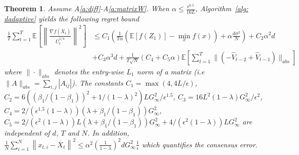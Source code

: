 \documentclass[11pt]{article}
\newtheorem{theorem}{Theorem}
\begin{document}
\begin{theorem}\label{thm: dagm_converge}
Assume A\ref{a:diff}-A\ref{a:matrixW}. %
	When $\alpha  \leq \frac{\epsilon^{0.5}}{16L} $, 
	  Algorithm~\ref{alg: dadaptive} yields the following regret bound
	  {\small
	\begin{align}\label{eq: thm11}
\frac{1}{T}\sum_{t=1}^T  \mathbb E \left [\left\|\frac{\nabla f( \overline X_{t})}{\overline U_{t}^{1/4}}\right\|^2  \right]
&	\leq   C_1\left(\frac{1}{T\alpha} ( \mathbb E  [f( Z_{1})]  -  \min_x  f(x)) +  \alpha  \frac{d\sigma^2}{N}\right) +  C_2 \alpha^2 d 
	\nonumber \\
    &+ C_3 \alpha^3d  + \frac{1}{T\sqrt{N}} (C_4 +  C_5 \alpha)  \mathbb E \left[ \sum_{t=1}^{T}   \|    (- \hat V_{t-2} + \hat V_{t-1} ) \|_{abs} \right] 
	\end{align}
	}%
where $\| \cdot\|_{abs}$  denotes the entry-wise $L_1$ norm of a matrix (i.e $\| A\|_{abs} = \sum_{i,j}{|A_{ij}|}$). The constants $C_1 =  \max (4, 4{L/\epsilon})$,
	$C_2 =  6 (( \beta_1/(1-\beta_1))^2 + 1/(1-\lambda)^2 )L  G_{\infty}^2 /\epsilon^{1.5}$,
	$C_3 =  16L^2  (1-\lambda) G_{\infty}^2/\epsilon^2$,
	$C_4 =   2/ (\epsilon^{1.5}(1-\lambda)) (     \lambda + \beta_1/(1-\beta_1)) G_{\infty}^2$,
	$C_5 =   2/ (\epsilon^{2}(1-\lambda))   L  (\lambda + \beta_1/(1-\beta_1)) G_{\infty}^2  + 4/ (\epsilon^{2}(1-\lambda))   L    G_{\infty}^2$ are independent of $d$, $T$ and $N$. In addition, $\frac{1}{N}\sum_{i=1}^N\left\| {  x_{t,i} -   \overline X_{t}}  \right\|^2   \leq \alpha^2 \left (\frac{1}{1-\lambda} \right)^2 d G_{\infty}^2 \frac{1}{\epsilon}$ which quantifies the consensus error.
\end{theorem}
\end{document}
